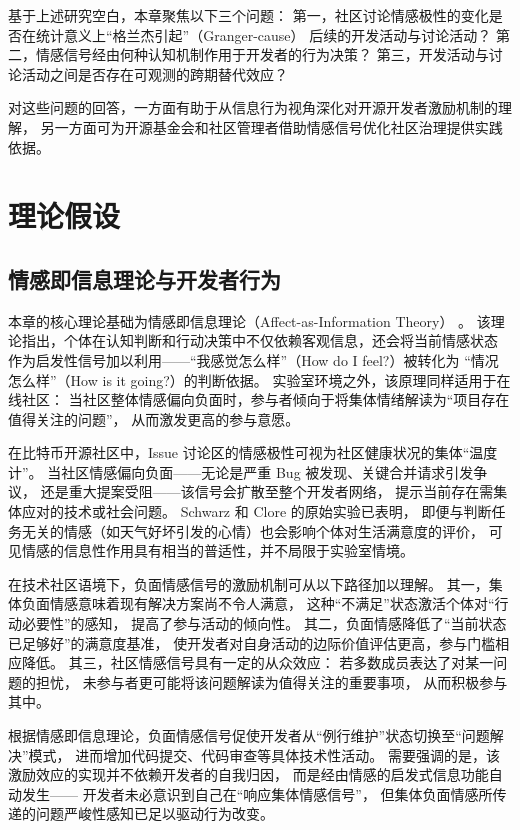 基于上述研究空白，本章聚焦以下三个问题：
第一，社区讨论情感极性的变化是否在统计意义上“格兰杰引起”（Granger-cause）
后续的开发活动与讨论活动？
第二，情感信号经由何种认知机制作用于开发者的行为决策？
第三，开发活动与讨论活动之间是否存在可观测的跨期替代效应？

对这些问题的回答，一方面有助于从信息行为视角深化对开源开发者激励机制的理解，
另一方面可为开源基金会和社区管理者借助情感信号优化社区治理提供实践依据。


\section{理论假设}

\subsection{情感即信息理论与开发者行为}

本章的核心理论基础为情感即信息理论（Affect-as-Information Theory）
\cite{schwarz1983moods}。
该理论指出，个体在认知判断和行动决策中不仅依赖客观信息，还会将当前情感状态
作为启发性信号加以利用——“我感觉怎么样”（How do I feel?）被转化为
“情况怎么样”（How is it going?）的判断依据。
实验室环境之外，该原理同样适用于在线社区：
当社区整体情感偏向负面时，参与者倾向于将集体情绪解读为“项目存在值得关注的问题”，
从而激发更高的参与意愿。

在比特币开源社区中，Issue 讨论区的情感极性可视为社区健康状况的集体“温度计”。
当社区情感偏向负面——无论是严重 Bug 被发现、关键合并请求引发争议，
还是重大提案受阻——该信号会扩散至整个开发者网络，
提示当前存在需集体应对的技术或社会问题。
Schwarz 和 Clore \citeyear{schwarz1983moods}的原始实验已表明，
即便与判断任务无关的情感（如天气好坏引发的心情）也会影响个体对生活满意度的评价，
可见情感的信息性作用具有相当的普适性，并不局限于实验室情境。

在技术社区语境下，负面情感信号的激励机制可从以下路径加以理解。
其一，集体负面情感意味着现有解决方案尚不令人满意，
这种“不满足”状态激活个体对“行动必要性”的感知，
提高了参与活动的倾向性。
其二，负面情感降低了“当前状态已足够好”的满意度基准，
使开发者对自身活动的边际价值评估更高，参与门槛相应降低。
其三，社区情感信号具有一定的从众效应：
若多数成员表达了对某一问题的担忧，
未参与者更可能将该问题解读为值得关注的重要事项，
从而积极参与其中\cite{yang2021differential}。

根据情感即信息理论，负面情感信号促使开发者从“例行维护”状态切换至“问题解决”模式，
进而增加代码提交、代码审查等具体技术性活动。
需要强调的是，该激励效应的实现并不依赖开发者的自我归因，
而是经由情感的启发式信息功能自动发生——
开发者未必意识到自己在“响应集体情感信号”，
但集体负面情感所传递的问题严峻性感知已足以驱动行为改变。

